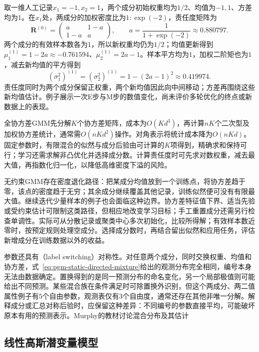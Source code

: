 \begin{example}[一轮可复核的高斯混合EM]
  \label{ex:pgm-static-directed-gmm-em}
  取一维人工记录$x_1=-1,x_2=1$，两个成分初始权重均为$1/2$、均值为$-1,1$、方差均为$1$。在$x_1$处，两成分的加权密度比为$1:\exp(-2)$，责任度矩阵为
  \[
    \bm{R}^{(0)}
      =\begin{pmatrix}a&1-a\\1-a&a\end{pmatrix},
    \qquad a=\frac{1}{1+\exp(-2)}\approx0.880797.
  \]
  两个成分的有效样本数各为$1$，所以新权重均仍为$1/2$；均值更新得到$\mu_1^{(1)}=1-2a\approx-0.761594$、$\mu_2^{(1)}=2a-1$。样本平方均为$1$，加权二阶矩也为$1$，减去新均值的平方得到
  \[
    (\sigma_1^2)^{(1)}=(\sigma_2^2)^{(1)}
      =1-(2a-1)^2\approx0.419974.
  \]
  责任度同时为两个成分保留正权重，两个新均值因此向中间移动；方差再围绕这些新均值估计。例子展示一次E步与M步的数值变化，尚未评价多轮优化的终点或新数据上的表现。
\end{example}

全协方差GMM先分解$K$个协方差矩阵，成本为$O(Kd^3)$，再计算$nK$个二次型及加权协方差统计，通常需$O(nKd^2)$操作。对角表示将统计成本降为$O(nKd)$。固定参数时，有限混合的似然与成分后验由可计算的$K$项得到，精确求和保持可行；学习还需求解非凸优化并选择成分数。计算责任度时可先求对数权重，减去最大值，再指数化归一化，以降低高维密度下溢的风险。

无约束GMM存在密度退化路径：把某成分均值放到一个训练点，将协方差趋于零，该点的密度趋于无穷；其余成分继续覆盖其他记录，训练似然便可没有有限最大值。继续迭代少量样本的例子也会面临这种边界。协方差特征值下界、适当先验或受约束估计可限制这类路径，但相应地改变学习目标；手工重置成分还需另行检查单调性。实际可从分散记录或聚类中心多次初始化，比较所得解；有效样本数近零时，按预定规则处理空成分。选择成分数时，再结合留出似然和应用任务，评估新增成分在训练数据以外的收益。

参数还具有（label switching）对称性。对任意两个成分，同时交换权重、均值和协方差，式~\eqref{eq:pgm-static-directed-mixture}给出的观测分布完全相同，编号本身无法由数据确定。置换得到的是同一预测分布的命名变化，另一个局部极值则可能给出不同预测。某些混合族在条件满足时可除置换外识别，但这个两成分、两二值属性例子有$5$个自由参数，观测表仅有$3$个自由度，通常还存在其他非唯一分解。解释成分或汇总对称后验时，应保留这种差异：不同编号的参数直接平均，可能破坏原本有用的预测表示。Murphy的教材讨论混合分布及其估计

\subsection{线性高斯潜变量模型}
\label{sec:pgm-static-directed-linear-gaussian}

